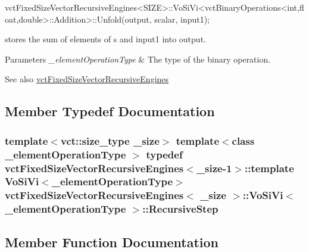 \begin{DoxyPre}vctFixedSizeVectorRecursiveEngines<SIZE>::VoSiVi<vctBinaryOperations<int,float,double>::Addition>::Unfold(output, scalar, input1);
\end{DoxyPre}
 stores the sum of elements of s and input1 into output.


\begin{DoxyParams}{Parameters}
{\em \+\_\+element\+Operation\+Type} & The type of the binary operation.\\
\hline
\end{DoxyParams}
\begin{DoxySeeAlso}{See also}
\hyperlink{classvct_fixed_size_vector_recursive_engines}{vct\+Fixed\+Size\+Vector\+Recursive\+Engines} 
\end{DoxySeeAlso}


\subsection{Member Typedef Documentation}
\hypertarget{classvct_fixed_size_vector_recursive_engines_1_1_vo_si_vi_a2a5c575fa0857d0d6c13610f43c9302d}{}
\subsubsection[{Recursive\+Step}]{\setlength{\rightskip}{0pt plus 5cm}template$<$vct\+::size\+\_\+type \+\_\+size$>$ template$<$class \+\_\+element\+Operation\+Type $>$ typedef {\bf vct\+Fixed\+Size\+Vector\+Recursive\+Engines}$<$\+\_\+size-\/1$>$\+::template {\bf Vo\+Si\+Vi}$<$\+\_\+element\+Operation\+Type$>$ {\bf vct\+Fixed\+Size\+Vector\+Recursive\+Engines}$<$ \+\_\+size $>$\+::{\bf Vo\+Si\+Vi}$<$ \+\_\+element\+Operation\+Type $>$\+::{\bf Recursive\+Step}}\label{classvct_fixed_size_vector_recursive_engines_1_1_vo_si_vi_a2a5c575fa0857d0d6c13610f43c9302d}


\subsection{Member Function Documentation}
\hypertarget{classvct_fixed_size_vector_recursive_engines_1_1_vo_si_vi_aecc1ea87eb108820d8778ce739c94df2}{}
